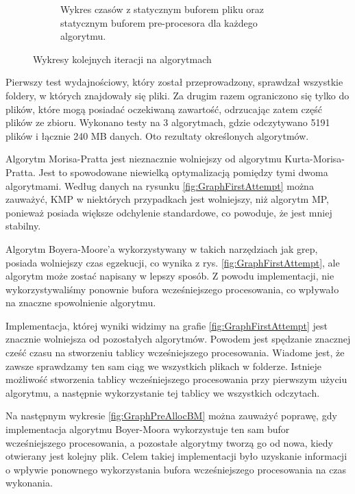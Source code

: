 \begin{figure}
\begin{subfigure}{0.8\textwidth}
    \caption{Wykres czasów z statycznym buforem pliku oraz statycznym buforem
    pre-procesora dla każdego algorytmu.}
    \label{fig:GraphStaticPreallocAndFileBuffer}
\end{subfigure}
\caption{Wykresy kolejnych iteracji na algorytmach}
\label{fig:GraphsIterationComparison}
\end{figure}

Pierwszy test wydajnościowy, który został przeprowadzony, sprawdzał wszystkie 
foldery, w których znajdowały się pliki. Za drugim razem ograniczono się tylko
do plików, które mogą posiadać oczekiwaną zawartość, odrzucając zatem część 
plików ze zbioru. Wykonano testy na 3 algorytmach, gdzie odczytywano 5191 plików 
i łącznie 240 MB danych. Oto rezultaty określonych algorytmów.

Algorytm Morisa-Pratta jest nieznacznie wolniejszy od algorytmu 
Kurta-Morisa-Pratta. Jest to spowodowane niewielką optymalizacją pomiędzy tymi 
dwoma algorytmami. Według danych na rysunku \ref{fig:GraphFirstAttempt} można 
zauważyć, KMP w niektórych przypadkach jest wolniejszy, niż algorytm MP, 
ponieważ posiada większe odchylenie standardowe, co powoduje, że jest mniej
stabilny. 



Algorytm Boyera-Moore'a wykorzystywany w takich narzędziach jak grep, posiada
wolniejszy czas egzekucji, co wynika z rys. \ref{fig:GraphFirstAttempt}, ale 
algorytm może zostać napisany w lepszy sposób. Z powodu implementacji, nie 
wykorzystywaliśmy ponownie bufora wcześniejszego procesowania, co wpływało na znaczne
spowolnienie algorytmu.

Implementacja, której wyniki widzimy na grafie \ref{fig:GraphFirstAttempt} jest
znacznie wolniejsza od pozostałych algorytmów. Powodem jest spędzanie znacznej
cześć czasu na stworzeniu tablicy wcześniejszego procesowania. Wiadome jest, że zawsze 
sprawdzamy ten sam ciąg we wszystkich plikach w folderze. Istnieje możliwość 
stworzenia tablicy wcześniejszego procesowania przy pierwszym użyciu algorytmu, a następnie
wykorzystanie tej tablicy we wszystkich odczytach.

Na następnym wykresie \ref{fig:GraphPreAllocBM} można zauważyć poprawę, gdy
implementacja algorytmu Boyer-Moora wykorzystuje ten sam bufor wcześniejszego procesowania, a
pozostałe algorytmy tworzą go od nowa, kiedy otwierany jest kolejny plik. Celem 
takiej implementacji było uzyskanie informacji o wpływie ponownego wykorzystania
bufora wcześniejszego procesowania na czas wykonania. 

